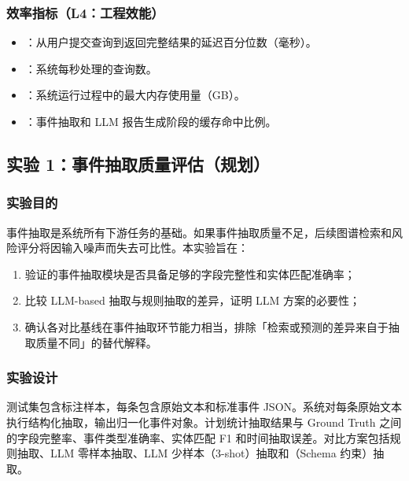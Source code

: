 \subsubsection{效率指标（L4：工程效能）}

\begin{itemize}
    \item {}：从用户提交查询到返回完整结果的延迟百分位数（毫秒）。
    \item {}：系统每秒处理的查询数。
    \item {}：系统运行过程中的最大内存使用量（GB）。
    \item {}：事件抽取和 LLM 报告生成阶段的缓存命中比例。
\end{itemize}

\subsection{实验 1：事件抽取质量评估（规划）}
\label{sec:exp-extraction}

\subsubsection{实验目的}

事件抽取是系统所有下游任务的基础。如果事件抽取质量不足，后续图谱检索和风险评分将因输入噪声而失去可比性。本实验旨在：
\begin{enumerate}
    \item 验证\projectshort 的事件抽取模块是否具备足够的字段完整性和实体匹配准确率；
    \item 比较 LLM-based 抽取与规则抽取的差异，证明 LLM 方案的必要性；
    \item 确认各对比基线在事件抽取环节能力相当，排除「检索或预测的差异来自于抽取质量不同」的替代解释。
\end{enumerate}

\subsubsection{实验设计}

测试集包含标注样本，每条包含原始文本和标准事件 JSON。系统对每条原始文本执行结构化抽取，输出归一化事件对象。计划统计抽取结果与 Ground Truth 之间的字段完整率、事件类型准确率、实体匹配 F1 和时间抽取误差。对比方案包括规则抽取、LLM 零样本抽取、LLM 少样本（3-shot）抽取和\projectshort（Schema 约束）抽取。


